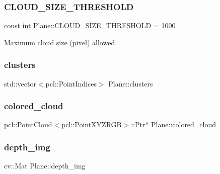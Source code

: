 \subsubsection{\texorpdfstring{C\+L\+O\+U\+D\+\_\+\+S\+I\+Z\+E\+\_\+\+T\+H\+R\+E\+S\+H\+O\+LD}{CLOUD\_SIZE\_THRESHOLD}}
{\footnotesize\ttfamily const int Plane\+::\+C\+L\+O\+U\+D\+\_\+\+S\+I\+Z\+E\+\_\+\+T\+H\+R\+E\+S\+H\+O\+LD = 1000}



Maximum cloud size (pixel) allowed. 

\hypertarget{class_plane_abd24055f6ac0b57fc3f36462f50175d8}{}\label{class_plane_abd24055f6ac0b57fc3f36462f50175d8} 
\subsubsection{\texorpdfstring{clusters}{clusters}}
{\footnotesize\ttfamily std\+::vector$<$pcl\+::\+Point\+Indices$>$ Plane\+::clusters\hspace{0.3cm}{\ttfamily [private]}}

\hypertarget{class_plane_a43513b679c313917824fce91b50f8d32}{}\label{class_plane_a43513b679c313917824fce91b50f8d32} 
\subsubsection{\texorpdfstring{colored\+\_\+cloud}{colored\_cloud}}
{\footnotesize\ttfamily pcl\+::\+Point\+Cloud$<$pcl\+::\+Point\+X\+Y\+Z\+R\+GB$>$\+::Ptr$\ast$ Plane\+::colored\+\_\+cloud\hspace{0.3cm}{\ttfamily [private]}}

\hypertarget{class_plane_a90280649d43c66562919b463054387e7}{}\label{class_plane_a90280649d43c66562919b463054387e7} 
\subsubsection{\texorpdfstring{depth\+\_\+img}{depth\_img}}
{\footnotesize\ttfamily cv\+::\+Mat Plane\+::depth\+\_\+img\hspace{0.3cm}{\ttfamily [private]}}

\hypertarget{class_plane_a08043629802a4740847a526b16ddc0b1}{}\label{class_plane_a08043629802a4740847a526b16ddc0b1} 
